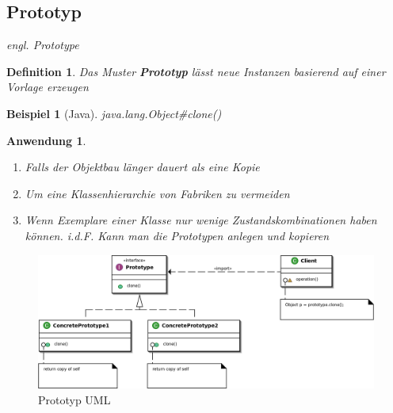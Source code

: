 \documentclass[a4paper]{article}
\theoremstyle{break}
\newtheorem{defi}{Definition}[section]
\newtheorem{ex}{Beispiel}[section]
\newtheorem{why}{Anwendung}[section]
\begin{document}
\subsection{Prototyp}
\textit{engl. Prototype}
\begin{defi}
	Das Muster \textbf{Prototyp} lässt neue Instanzen basierend auf einer Vorlage erzeugen
\end{defi}
\begin{ex}[Java]
	java.lang.Object\#clone()
\end{ex}
\begin{why}
	\begin{enumerate}
		\item Falls der Objektbau länger dauert als eine Kopie
		\item Um eine Klassenhierarchie von Fabriken zu vermeiden
		\item Wenn Exemplare einer Klasse nur wenige Zustandskombinationen haben können. i.d.F. Kann man die Prototypen anlegen und kopieren
	\end{enumerate}
\end{why}
\begin{figure}[H]
	\centering
	\includegraphics[width=\textwidth]{../diagrams/uml/PrototypePattern.png}
	\caption{Prototyp UML}
\end{figure}
\end{document}
